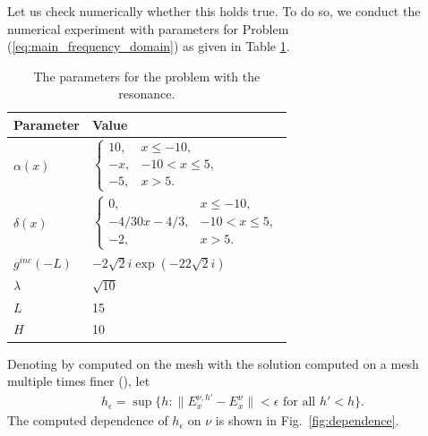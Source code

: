 Let us check numerically whether this holds true. 
To do so, we conduct the  numerical experiment with parameters for Problem 
(\ref{eq:main_frequency_domain}) as given in Table \ref{tab:parameters}. 
\begin{table}[htb!]
\begin{tabular}{l|l}
Parameter & Value \\
\hline
$\alpha(x)$ & $\left\{\begin{array}{lr}
10, & x\leq -10,\\
-x, & -10<x\leq 5,\\
-5, & x>5.
\end{array}\right.$ \\
$\delta(x)$ & 
$\left\{\begin{array}{lr}
0, & x\leq -10,\\
-4/30x-4/3,& -10<x\leq 5,\\
-2, & x>5.
\end{array}\right.$ \\
$g^{inc}(-L)$ & $-2 \sqrt{2}i\exp(-22\sqrt{2}i)$\\
$\lambda$ & 
$\sqrt{10}$\\
$L$& 15\\
$H$ & 10 \\
\end{tabular}
\caption{The parameters for the problem with the resonance.}
\label{tab:parameters}
\end{table}
Denoting by  computed on the mesh with  the solution computed on a mesh multiple times finer (), let 
\begin{align}
\label{eq:def_epsilon}
h_{\epsilon}=\sup\{h: \|E_{x}^{\nu,h'}-E_{x}^{\nu}\|<\epsilon \text{ for all } h'<h\}.
\end{align}
The computed dependence of $h_{\epsilon}$ on $\nu$ is shown in Fig.~\ref{fig:dependence}.
